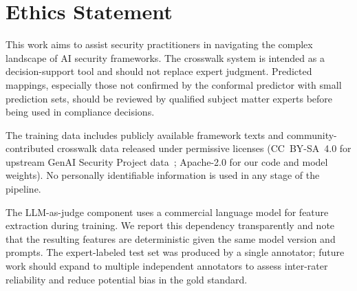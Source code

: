 \section{Ethics Statement}
\label{sec:ethics}

This work aims to assist security practitioners in navigating the
complex landscape of AI security frameworks. The crosswalk system is
intended as a decision-support tool and should not replace expert
judgment. Predicted mappings, especially those not confirmed by the
conformal predictor with small prediction sets, should be reviewed by
qualified subject matter experts before being used in compliance
decisions.

The training data includes publicly available framework texts and
community-contributed crosswalk data released under permissive licenses
(CC~BY-SA~4.0 for upstream GenAI Security Project
data~\citep{genai_security_project}; Apache-2.0 for our code and model
weights). No personally identifiable information is used in any stage
of the pipeline.

The LLM-as-judge component uses a commercial language model for feature
extraction during training. We report this dependency transparently and
note that the resulting features are deterministic given the same model
version and prompts. The expert-labeled test set was produced by a
single annotator; future work should expand to multiple independent
annotators to assess inter-rater reliability and reduce potential bias
in the gold standard.

